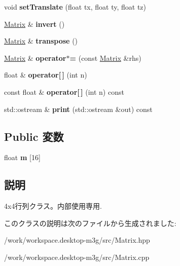 \begin{CompactItemize}
\item 
\hypertarget{classm3g_1_1Matrix_550cf39dca5ec8d74d719b0dcdecdd4b}{
void \textbf{setTranslate} (float tx, float ty, float tz)}
\label{classm3g_1_1Matrix_550cf39dca5ec8d74d719b0dcdecdd4b}

\item 
\hypertarget{classm3g_1_1Matrix_f26a87130b4bbc951b85074a8c308a0e}{
\hyperlink{classm3g_1_1Matrix}{Matrix} \& \textbf{invert} ()}
\label{classm3g_1_1Matrix_f26a87130b4bbc951b85074a8c308a0e}

\item 
\hypertarget{classm3g_1_1Matrix_d27ed380c287f6489575eb838010cf72}{
\hyperlink{classm3g_1_1Matrix}{Matrix} \& \textbf{transpose} ()}
\label{classm3g_1_1Matrix_d27ed380c287f6489575eb838010cf72}

\item 
\hypertarget{classm3g_1_1Matrix_5d28596666a27f88d74bacceaef9b326}{
\hyperlink{classm3g_1_1Matrix}{Matrix} \& \textbf{operator$\ast$=} (const \hyperlink{classm3g_1_1Matrix}{Matrix} \&rhs)}
\label{classm3g_1_1Matrix_5d28596666a27f88d74bacceaef9b326}

\item 
\hypertarget{classm3g_1_1Matrix_014a3abc30da6ad739fcce9aa3fa28fe}{
float \& \textbf{operator\mbox{[}$\,$\mbox{]}} (int n)}
\label{classm3g_1_1Matrix_014a3abc30da6ad739fcce9aa3fa28fe}

\item 
\hypertarget{classm3g_1_1Matrix_7aa4dbded39fe1de76fbb0f81b57085e}{
const float \& \textbf{operator\mbox{[}$\,$\mbox{]}} (int n) const }
\label{classm3g_1_1Matrix_7aa4dbded39fe1de76fbb0f81b57085e}

\item 
\hypertarget{classm3g_1_1Matrix_6fea17fa1532df3794f8cb39cb4f911f}{
std::ostream \& \textbf{print} (std::ostream \&out) const }
\label{classm3g_1_1Matrix_6fea17fa1532df3794f8cb39cb4f911f}

\end{CompactItemize}
\subsection*{Public 変数}
\begin{CompactItemize}
\item 
\hypertarget{classm3g_1_1Matrix_68147cce833d98b698183d68629e38d5}{
float \textbf{m} \mbox{[}16\mbox{]}}
\label{classm3g_1_1Matrix_68147cce833d98b698183d68629e38d5}

\end{CompactItemize}


\subsection{説明}
4x4行列クラス。内部使用専用. 

このクラスの説明は次のファイルから生成されました:\begin{CompactItemize}
\item 
/work/workspace.desktop-m3g/src/Matrix.hpp\item 
/work/workspace.desktop-m3g/src/Matrix.cpp\end{CompactItemize}
